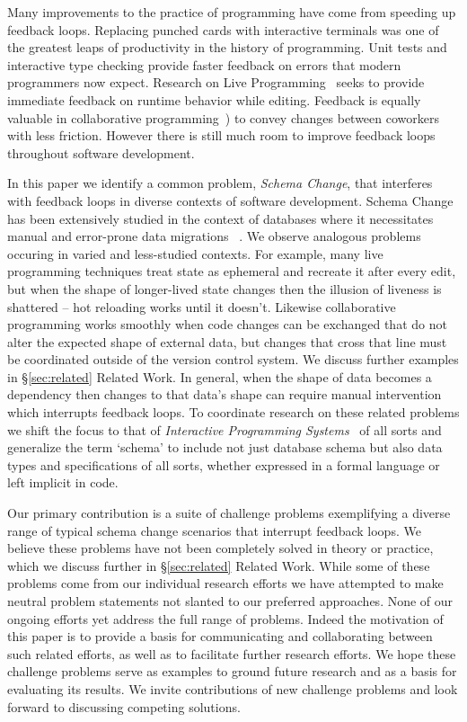 \documentclass[english,submission]{programming}
\begin{document}
Many improvements to the practice of programming have come from speeding up feedback loops. Replacing punched cards with interactive terminals was one of the greatest leaps of productivity in the history of programming. Unit tests and interactive type checking provide faster feedback on errors that modern programmers now expect. Research on Live Programming~\cite{rein2018exploratory} seeks to provide immediate feedback on runtime behavior while editing. Feedback is equally valuable in collaborative programming~\cite{ProGit, goldman2011real,kurniawan2015coder,replit}) to convey changes between coworkers with less friction.
However there is still much room to improve feedback loops throughout software development.

In this paper we identify a common problem, \emph{Schema Change}, that interferes with feedback loops in diverse contexts of software development. Schema Change has been extensively studied in the context of databases where it necessitates manual and error-prone data migrations ~\cite{erhard06}. We observe analogous problems occuring in varied and less-studied contexts. For example, many live programming techniques treat state as ephemeral and recreate it after every edit, but when the shape of longer-lived state changes then the illusion of liveness is shattered -- hot reloading works until it doesn't. Likewise collaborative programming works smoothly when code changes can be exchanged that do not alter the expected shape of external data, but changes that cross that line must be coordinated outside of the version control system. We discuss further examples in \S\ref{sec:related} Related Work. In general, when the shape of data becomes a dependency then changes to that data's shape can require manual intervention which interrupts feedback loops. To coordinate research on these related problems we shift the focus to that of \emph{Interactive Programming Systems}~\cite{techdims} of all sorts and generalize the term `schema' to include not just database schema but also data types and specifications of all sorts, whether expressed in a formal language or left implicit in code.

Our primary contribution is a suite of challenge problems exemplifying a diverse range of typical schema change scenarios that interrupt feedback loops. We believe these problems have not been completely solved in theory or practice, which we discuss further in \S\ref{sec:related} Related Work. While some of these problems come from our individual research efforts we have attempted to make neutral problem statements not slanted to our preferred approaches. None of our ongoing efforts yet address the full range of problems. Indeed the motivation of this paper is to provide a basis for communicating and collaborating between such related efforts, as well as to facilitate further research efforts. We hope these challenge problems serve as examples to ground future research and as a basis for evaluating its results. We invite contributions of new challenge problems and look forward to discussing competing solutions.
\end{document}
